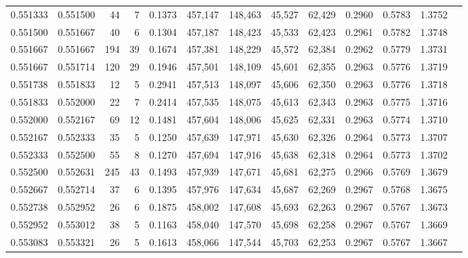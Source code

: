 \begin{tabular}{rrrrrrrrrrrrr}
0.551333 & 0.551500 &    44 &   7 &                                     0.1373 & 457,147 & 148,463 &  45,527 &  62,429 & 0.2960 & 0.5783 & 1.3752 \\
0.551500 & 0.551667 &    40 &   6 &                                     0.1304 & 457,187 & 148,423 &  45,533 &  62,423 & 0.2961 & 0.5782 & 1.3748 \\
0.551667 & 0.551667 &   194 &  39 &                                     0.1674 & 457,381 & 148,229 &  45,572 &  62,384 & 0.2962 & 0.5779 & 1.3731 \\
0.551667 & 0.551714 &   120 &  29 &                                     0.1946 & 457,501 & 148,109 &  45,601 &  62,355 & 0.2963 & 0.5776 & 1.3719 \\
0.551738 & 0.551833 &    12 &   5 &                                     0.2941 & 457,513 & 148,097 &  45,606 &  62,350 & 0.2963 & 0.5776 & 1.3718 \\
0.551833 & 0.552000 &    22 &   7 &                                     0.2414 & 457,535 & 148,075 &  45,613 &  62,343 & 0.2963 & 0.5775 & 1.3716 \\
0.552000 & 0.552167 &    69 &  12 &                                     0.1481 & 457,604 & 148,006 &  45,625 &  62,331 & 0.2963 & 0.5774 & 1.3710 \\
0.552167 & 0.552333 &    35 &   5 &                                     0.1250 & 457,639 & 147,971 &  45,630 &  62,326 & 0.2964 & 0.5773 & 1.3707 \\
0.552333 & 0.552500 &    55 &   8 &                                     0.1270 & 457,694 & 147,916 &  45,638 &  62,318 & 0.2964 & 0.5773 & 1.3702 \\
0.552500 & 0.552631 &   245 &  43 &                                     0.1493 & 457,939 & 147,671 &  45,681 &  62,275 & 0.2966 & 0.5769 & 1.3679 \\
0.552667 & 0.552714 &    37 &   6 &                                     0.1395 & 457,976 & 147,634 &  45,687 &  62,269 & 0.2967 & 0.5768 & 1.3675 \\
0.552738 & 0.552952 &    26 &   6 &                                     0.1875 & 458,002 & 147,608 &  45,693 &  62,263 & 0.2967 & 0.5767 & 1.3673 \\
0.552952 & 0.553012 &    38 &   5 &                                     0.1163 & 458,040 & 147,570 &  45,698 &  62,258 & 0.2967 & 0.5767 & 1.3669 \\
0.553083 & 0.553321 &    26 &   5 &                                     0.1613 & 458,066 & 147,544 &  45,703 &  62,253 & 0.2967 & 0.5767 & 1.3667 \\

\end{tabular}
